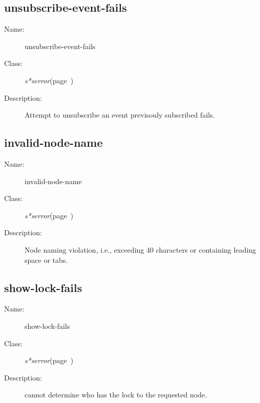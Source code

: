 \subsection{unsubscribe-event-fails}
\label{unsubscribe-event-fails}

\begin{description}

\item [Name:]  unsubscribe-event-fails


\item [Class:]
{\sl s*serror}\hfill(page~\pageref{s*serror})


\item [Description:]
Attempt to unsubscribe an event previsouly subscribed
fails.


\end{description}
\horizontalline

\subsection{invalid-node-name}
\label{invalid-node-name}

\begin{description}

\item [Name:]  invalid-node-name


\item [Class:]
{\sl s*serror}\hfill(page~\pageref{s*serror})


\item [Description:]
Node naming violation, i.e., exceeding 40 characters or
containing leading space or tabs.


\end{description}
\horizontalline

\subsection{show-lock-fails}
\label{show-lock-fails}

\begin{description}
\item [Name:]  show-lock-fails


\item [Class:]
{\sl s*serror}\hfill(page~\pageref{s*serror})


\item [Description:]
cannot determine who has the lock to the requested node.


\end{description}
\horizontalline

